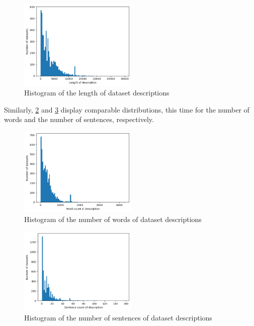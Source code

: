 \begin{figure}[h]
    \centering
    \includegraphics[width=0.5\textwidth]{figures/length_of_descriptions.png}
    \caption{Histogram of the length of dataset descriptions}
    \label{fig:length_of_descriptions}
\end{figure}

Similarly, \cref{fig:words_of_descriptions} and \cref{fig:sentences_of_descriptions} display comparable distributions, this time for the number of words and the number of sentences, respectively.

\begin{figure}[h]
    \centering
    \includegraphics[width=0.5\textwidth]{figures/words_of_descriptions.png}
    \caption{Histogram of the number of words of dataset descriptions}
    \label{fig:words_of_descriptions}
\end{figure}

\begin{figure}[h]
    \centering
    \includegraphics[width=0.5\textwidth]{figures/sentences_of_descriptions.png}
    \caption{Histogram of the number of sentences of dataset descriptions}
    \label{fig:sentences_of_descriptions}
\end{figure}


